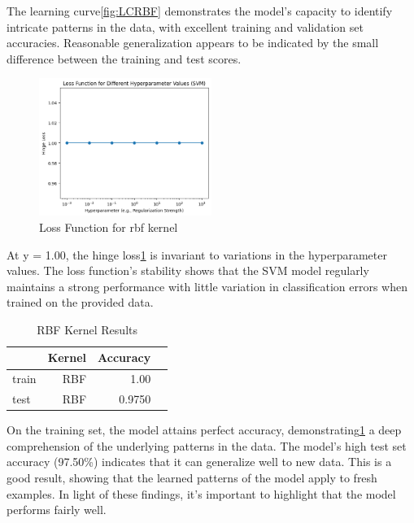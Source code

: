 \documentclass[12pt,a4paper,twocolumn]{article}
\begin{document}
The learning curve\ref{fig:LCRBF} demonstrates the model's capacity to identify intricate patterns in the data, with excellent training and validation set accuracies. Reasonable generalization appears to be indicated by the small difference between the training and test scores.

\begin{figure}[H]
\includegraphics[width=0.5\textwidth]{images2/lossRBF.png}
\centering
\caption{\label{fig:LossRBF} Loss Function for rbf kernel}
\end{figure}

At y = 1.00, the hinge loss\ref{fig:LossRBF} is invariant to variations in the hyperparameter values. The loss function's stability shows that the SVM model regularly maintains a strong performance with little variation in classification errors when trained on the provided data.

\begin{table}[h!]
    \centering
\begin{tabular}{lrrr}
\toprule
{}& Kernel &       Accuracy  \\
\midrule
train & RBF &  1.00  \\
test  & RBF &  0.9750 \\

\bottomrule
\end{tabular}
    \caption{RBF Kernel Results}
    \label{tab:resultsRBF}
\end{table}



On the training set, the model attains perfect accuracy, demonstrating\ref{tab:resultsRBF} a deep comprehension of the underlying patterns in the data. The model's high test set accuracy (97.50\%) indicates that it can generalize well to new data. This is a good result, showing that the learned patterns of the model apply to fresh examples. In light of these findings, it's important to highlight that the model performs fairly well. 
\end{document}
